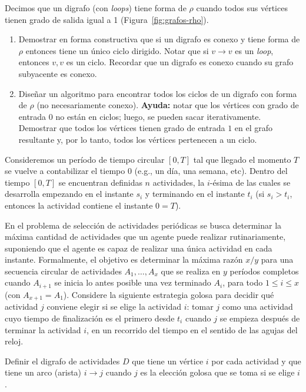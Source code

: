 
 \item Decimos que un digrafo (con \textit{loops}) tiene forma de $\rho$ cuando todos sus vértices tienen grado de salida igual a 1 (Figura~\ref{fig:grafos-rho}).
 \begin{enumerate}[label=$\alph*)$,ref=$\alph*)$]
  \item Demostrar en forma constructiva que si un digrafo es conexo y tiene forma de $\rho$ entonces tiene un único ciclo dirigido.  Notar que si $v \to v$ es un \textit{loop}, entonces $v, v$ es un ciclo.  Recordar que un digrafo es conexo cuando su grafo subyacente es conexo.
  \item Diseñar un algoritmo para encontrar todos los ciclos de un digrafo con forma de $\rho$ (no necesariamente conexo). \textbf{Ayuda:} notar que los vértices con grado de entrada $0$ no están en ciclos; luego, se pueden sacar iterativamente.  Demostrar que todos los vértices tienen grado de entrada $1$ en el grafo resultante y, por lo tanto, todos los vértices pertenecen a un ciclo.
 \end{enumerate}

 Consideremos un período de tiempo circular $[0, T]$ tal que llegado el momento $T$ se vuelve a contabilizar el tiempo 0 (e.g., un día, una semana, etc).  Dentro del tiempo $[0, T]$ se encuentran definidas $n$ actividades, la $i$-ésima de las cuales se desarrolla empezando en el instante $s_i$ y terminando en el instante $t_i$ (si $s_i > t_i$, entonces la actividad contiene el instante $0 = T$).

 En el problema de selección de actividades periódicas se busca determinar la máxima cantidad de actividades que un agente puede realizar rutinariamente, suponiendo que el agente es capaz de realizar una única actividad en cada instante.  Formalmente, el objetivo es determinar la máxima razón $x/y$ para una secuencia circular de actividades $A_1, \ldots, A_x$ que se realiza en $y$ períodos completos cuando $A_{i+1}$ se inicia lo antes posible una vez terminado $A_i$, para todo $1 \leq i \leq x$ (con $A_{x+1} = A_1$).  Considere la siguiente estrategia golosa para decidir qué actividad $j$ conviene elegir si se elige la actividad $i$: tomar $j$ como una actividad cuyo tiempo de finalización es el primero desde $t_i$ cuando $j$ se empieza después de terminar la actividad $i$, en un recorrido del tiempo en el sentido de las agujas del reloj.

 Definir el digrafo de actividades $D$ que tiene un vértice $i$ por cada actividad y que tiene un arco (arista) $i \to j$ cuando $j$ es la elección golosa que se toma si se elige $i$.

